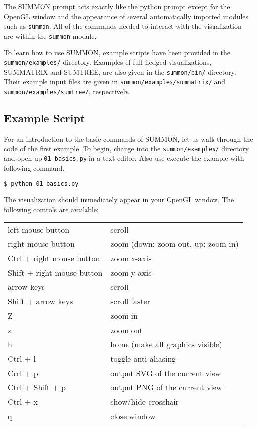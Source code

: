\documentclass[12pt]{article}
\newcommand{\code}[1]{{\tt #1}}
\newcommand{\codeblock}[1]{\vspace{.1in} {\tt #1} \vspace{.1in}}
\begin{document}
The SUMMON prompt acts exactly like the python prompt except for the OpenGL
window and the appearance of several automatically imported modules such as 
\code{summon}.  All of the commands needed to interact with the visualization
are within the \code{summon}  module.  

To learn how to use SUMMON, example scripts have been provided in the 
\code{summon/examples/} directory.  Examples of full fledged visualizations,
SUMMATRIX and SUMTREE, are also given in the \code{summon/bin/} directory. 
Their example input files are given in \code{summon/examples/summatrix/} and
\code{summon/examples/sumtree/}, respectively.



\subsection{Example Script}

For an introduction to the basic commands of SUMMON, let us walk through the
code of the first example.  To begin, change into the
\code{summon/examples/} directory and open up \code{01\_basics.py} in a
text editor.  Also use execute the example with following command.

\codeblock{\$ python 01\_basics.py}

The visualization should immediately appear in your OpenGL window.  The
following controls are available:

\vspace{.1in}
\begin{tabular}{ll}
    left mouse button          & scroll \\
    right mouse button         & zoom (down: zoom-out, up: zoom-in)\\
    Ctrl + right mouse button  & zoom x-axis \\
    Shift + right mouse button & zoom y-axis \\
    arrow keys                 & scroll \\
    Shift + arrow keys         & scroll faster \\
    Z                          & zoom in \\
    z                          & zoom out \\
    h                          & home (make all graphics visible) \\
    Ctrl + l                   & toggle anti-aliasing \\
    Crrl + p                   & output SVG of the current view \\
    Ctrl + Shift + p           & output PNG of the current view \\
    Ctrl + x                   & show/hide crosshair \\
    q                          & close window \\
\end{tabular}
\vspace{.2in}
\end{document}
